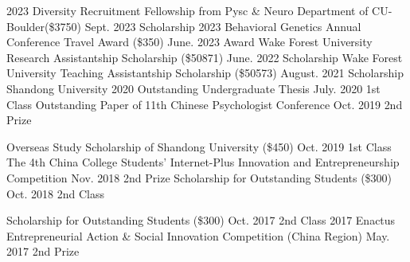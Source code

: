 




\begin{cvhonors}
  \cvhonor
    {2023 Diversity Recruitment Fellowship from Pysc \& Neuro Department of CU-Boulder(\$3750) } %
    {Sept. 2023} %
     {Scholarship}
  \cvhonor
    {2023 Behavioral Genetics Annual Conference Travel Award (\$350)} %
    {June. 2023} %
     {Award }
  \cvhonor
    {Wake Forest University Research Assistantship Scholarship (\$50871)} %
    {June. 2022} %
     {Scholarship }
  \cvhonor
    {Wake Forest University Teaching Assistantship Scholarship (\$50573)} %
    {August. 2021} %
     {Scholarship }
  \cvhonor
    {Shandong University 2020 Outstanding Undergraduate Thesis} %
    {July. 2020} %
     {1st Class }
  \cvhonor
    {Outstanding Paper of 11th Chinese Psychologist Conference} %
    {Oct. 2019} %
    {2nd Prize}

  \cvhonor
    {Overseas Study Scholarship of Shandong University (\approx\$450)} %
    {Oct. 2019} %
     {1st Class}
  \cvhonor
    {The 4th China College Students' Internet-Plus Innovation and Entrepreneurship Competition} %
    {Nov. 2018} %
    {2nd Prize} %
  \cvhonor
    {Scholarship for Outstanding Students (\approx\$300)} %
    {Oct. 2018} %
    {2nd Class}
    
    \cvhonor
    {Scholarship for Outstanding Students (\approx\$300)} %
    {Oct. 2017} %
    {2nd Class} %
  \cvhonor
    {2017 Enactus Entrepreneurial Action \& Social Innovation Competition (China Region)} %
    {May. 2017} %
    {2nd Prize}


\end{cvhonors}


